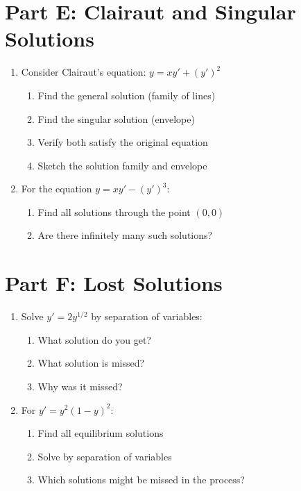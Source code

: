 \documentclass[12pt]{article}
\begin{document}
\section*{Part E: Clairaut and Singular Solutions}

\begin{enumerate}[start=14]
    \item Consider Clairaut's equation: $y = xy' + (y')^2$
    \begin{enumerate}[label=(\alph*)]
        \item Find the general solution (family of lines)
        \item Find the singular solution (envelope)
        \item Verify both satisfy the original equation
        \item Sketch the solution family and envelope
    \end{enumerate}
    
    \item For the equation $y = xy' - (y')^3$:
    \begin{enumerate}[label=(\alph*)]
        \item Find all solutions through the point $(0, 0)$
        \item Are there infinitely many such solutions?
    \end{enumerate}
\end{enumerate}

\section*{Part F: Lost Solutions}

\begin{enumerate}[start=16]
    \item Solve $y' = 2y^{1/2}$ by separation of variables:
    \begin{enumerate}[label=(\alph*)]
        \item What solution do you get?
        \item What solution is missed?
        \item Why was it missed?
    \end{enumerate}
    
    \item For $y' = y^2(1-y)^2$:
    \begin{enumerate}[label=(\alph*)]
        \item Find all equilibrium solutions
        \item Solve by separation of variables
        \item Which solutions might be missed in the process?
    \end{enumerate}
\end{enumerate}
\end{document}
